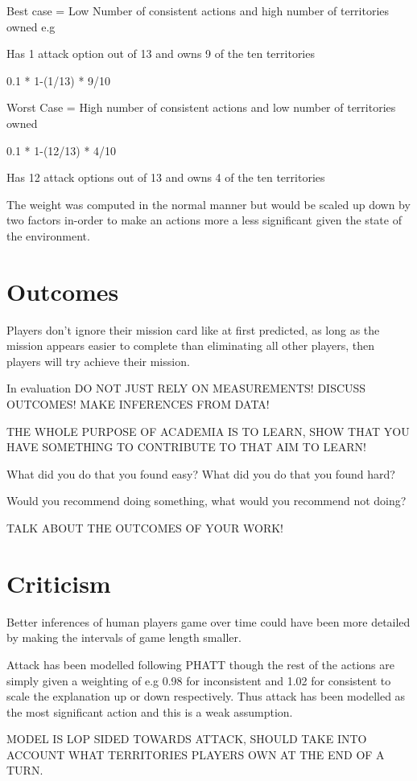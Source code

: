 \documentclass[parskip]{cs4rep}
\begin{document}
Best case = Low Number of consistent actions and high number of territories owned e.g

Has 1 attack option out of 13 and owns 9 of the ten territories

0.1 * 1-(1/13) * 9/10 

Worst Case = High number of consistent actions and low number of territories owned

0.1 * 1-(12/13) * 4/10 

Has 12 attack options out of 13 and owns 4 of the ten territories

The weight was computed in the normal manner but would be scaled up down by two factors in-order to make an actions more a less significant given the state of the environment.

\section{Outcomes}

Players don't ignore their mission card like at first predicted, as long as the mission appears easier to complete than eliminating all other players, then players will try achieve their mission.

In evaluation DO NOT JUST RELY ON MEASUREMENTS! DISCUSS OUTCOMES! MAKE INFERENCES FROM DATA!

THE WHOLE PURPOSE OF ACADEMIA IS TO LEARN, SHOW THAT YOU HAVE SOMETHING TO CONTRIBUTE TO THAT AIM TO LEARN!

What did you do that you found easy? What did you do that you found hard? 

Would you recommend doing something, what would you recommend not doing?

TALK ABOUT THE OUTCOMES OF YOUR WORK!

\section{Criticism}

Better inferences of human players game over time could have been more detailed by making the intervals of game length smaller.

Attack has been modelled following PHATT though the rest of the actions are simply given a weighting of e.g 0.98 for inconsistent and 1.02 for consistent to scale the explanation up or down respectively. Thus attack has been modelled as the most significant action and this is a weak assumption.

MODEL IS LOP SIDED TOWARDS ATTACK, SHOULD TAKE INTO ACCOUNT WHAT TERRITORIES PLAYERS OWN AT THE END OF A TURN.
\end{document}
